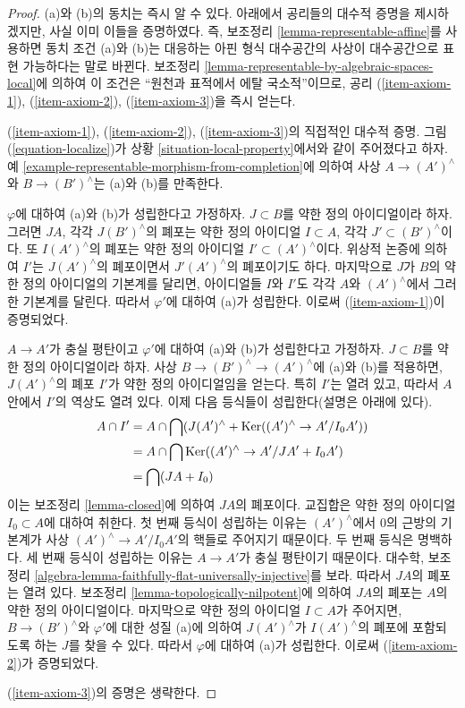 \begin{proof}
(a)와 (b)의 동치는 즉시 알 수 있다. 아래에서 공리들의 대수적
증명을 제시하겠지만, 사실 이미 이들을 증명하였다. 즉, 보조정리
\ref{lemma-representable-affine}를 사용하면 동치 조건 (a)와 (b)는
대응하는 아핀 형식 대수공간의 사상이 대수공간으로 표현 가능하다는
말로 바뀐다. 보조정리
\ref{lemma-representable-by-algebraic-spaces-local}에 의하여 이 조건은
``원천과 표적에서 에탈 국소적''이므로, 공리
(\ref{item-axiom-1}), (\ref{item-axiom-2}),
(\ref{item-axiom-3})을 즉시 얻는다.

\medskip\noindent
(\ref{item-axiom-1}), (\ref{item-axiom-2}),
(\ref{item-axiom-3})의 직접적인 대수적 증명. 그림
(\ref{equation-localize})가 상황
\ref{situation-local-property}에서와 같이 주어졌다고 하자. 예
\ref{example-representable-morphism-from-completion}에 의하여 사상
$A \to (A')^\wedge$와 $B \to (B')^\wedge$는 (a)와 (b)를
만족한다.

\medskip\noindent
$\varphi$에 대하여 (a)와 (b)가 성립한다고 가정하자.
$J \subset B$를 약한 정의 아이디얼이라 하자. 그러면 $JA$, 각각
$J(B')^\wedge$의 폐포는 약한 정의 아이디얼 $I \subset A$, 각각
$J' \subset (B')^\wedge$이다. 또 $I(A')^\wedge$의 폐포는 약한 정의
아이디얼 $I' \subset (A')^\wedge$이다. 위상적 논증에 의하여
$I'$는 $J(A')^\wedge$의 폐포이면서 $J'(A')^\wedge$의 폐포이기도
하다. 마지막으로 $J$가 $B$의 약한 정의 아이디얼의 기본계를
달리면, 아이디얼들 $I$와 $I'$도 각각 $A$와 $(A')^\wedge$에서
그러한 기본계를 달린다. 따라서 $\varphi'$에 대하여 (a)가
성립한다. 이로써 (\ref{item-axiom-1})이 증명되었다.

\medskip\noindent
$A \to A'$가 충실 평탄이고 $\varphi'$에 대하여 (a)와 (b)가
성립한다고 가정하자. $J \subset B$를 약한 정의 아이디얼이라 하자.
사상 $B \to (B')^\wedge \to (A')^\wedge$에 (a)와 (b)를 적용하면,
$J(A')^\wedge$의 폐포 $I'$가 약한 정의 아이디얼임을 얻는다.
특히 $I'$는 열려 있고, 따라서 $A$ 안에서 $I'$의 역상도 열려 있다.
이제 다음 등식들이 성립한다(설명은 아래에 있다).
\begin{align*}
A \cap I'
& =
A \cap \bigcap (J(A')^\wedge + \mathop{\mathrm{Ker}}((A')^\wedge \to A'/I_0A')) \\
& =
A \cap \bigcap \mathop{\mathrm{Ker}}((A')^\wedge \to A'/JA' + I_0 A') \\
& = \bigcap (JA + I_0)
\end{align*}
이는 보조정리 \ref{lemma-closed}에 의하여 $JA$의 폐포이다.
교집합은 약한 정의 아이디얼 $I_0 \subset A$에 대하여 취한다.
첫 번째 등식이 성립하는 이유는 $(A')^\wedge$에서 $0$의 근방의
기본계가 사상 $(A')^\wedge \to A'/I_0A'$의 핵들로 주어지기
때문이다. %
두 번째 등식은 명백하다. 세 번째 등식이 성립하는 이유는
$A \to A'$가 충실 평탄이기 때문이다. %
대수학, 보조정리
\ref{algebra-lemma-faithfully-flat-universally-injective}를 보라.
따라서 $JA$의 폐포는 열려 있다. 보조정리
\ref{lemma-topologically-nilpotent}에 의하여 $JA$의 폐포는 $A$의
약한 정의 아이디얼이다. 마지막으로 약한 정의 아이디얼
$I \subset A$가 주어지면, $B \to (B')^\wedge$와 $\varphi'$에 대한
성질 (a)에 의하여 $J(A')^\wedge$가 $I(A')^\wedge$의 폐포에
포함되도록 하는 $J$를 찾을 수 있다. 따라서 $\varphi$에 대하여
(a)가 성립한다. 이로써 (\ref{item-axiom-2})가 증명되었다.

\medskip\noindent
(\ref{item-axiom-3})의 증명은 생략한다.
\end{proof}

